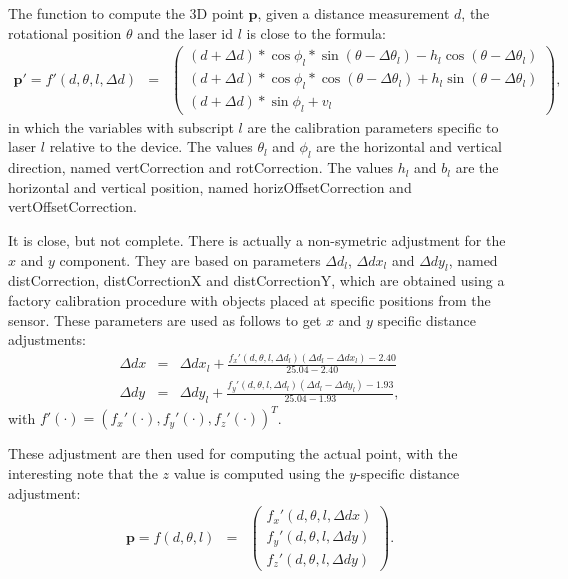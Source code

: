 \documentclass[english]{article}
\begin{document}
The function to compute the 3D point $\mathbf{p}$, given a distance measurement $d$,
the rotational position $\theta$ and the laser id $l$ is close to
the formula:
\begin{eqnarray}
  \mathbf{p'} =
  f'(d, \theta, l, \Delta d) &=& \left(
           \begin{array}{l}
             (d + \Delta d) * \cos{\phi_l} * \sin(\theta - \Delta \theta_l) - h_l \cos(\theta - \Delta \theta_l) \\
             (d + \Delta d) * \cos{\phi_l} * \cos(\theta - \Delta \theta_l) + h_l \sin(\theta - \Delta \theta_l) \\
             (d + \Delta d) * \sin{\phi_l} + v_l
           \end{array}
         \right),
  \label{eq:ptilde}
\end{eqnarray}
in which the variables with subscript $l$ are the calibration parameters
specific to laser $l$ relative to the device. The values $\theta_l$ and
$\phi_l$ are the horizontal and vertical direction, named vertCorrection
and rotCorrection. The values $h_l$ and $b_l$ are the horizontal and
vertical position, named horizOffsetCorrection and vertOffsetCorrection.

It is close, but not complete. There is actually a non-symetric adjustment
for the $x$ and $y$ component. They are based on parameters $\Delta
d_l$, $\Delta dx_l$ and $\Delta dy_l$, named distCorrection,
distCorrectionX and distCorrectionY, which are obtained using a factory
calibration procedure with objects placed at specific positions from the
sensor.  These parameters are used as follows to get $x$ and $y$
specific distance adjustments:
\begin{eqnarray}
  \Delta dx &=& \Delta dx_l + \frac{f_x'(d, \theta, l, \Delta d_l)(\Delta d_l - \Delta dx_l) - 2.40}{25.04 - 2.40}  \label{eq:ddx} \\
  \Delta dy &=& \Delta dy_l + \frac{f_y'(d, \theta, l, \Delta d_l)(\Delta d_l - \Delta dy_l) - 1.93}{25.04 - 1.93}, \label{eq:ddy}
\end{eqnarray}
with $f'(\cdot) = \left(f_x'(\cdot) , f_y'(\cdot) , f_z'(\cdot) \right)^T$.

These adjustment are then used for computing the actual point, with the
interesting note that the $z$ value is computed using the $y$-specific
distance adjustment:
\begin{eqnarray}
  \mathbf{p} =
  f(d, \theta, l) &=& \left(
           \begin{array}{l}
              f_x'(d, \theta, l, \Delta dx) \\
              f_y'(d, \theta, l, \Delta dy) \\
              f_z'(d, \theta, l, \Delta dy)
           \end{array}
         \right).
  \label{eq:p}
\end{eqnarray}
\end{document}
